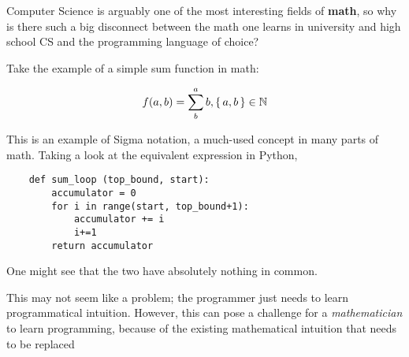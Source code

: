 \documentclass[../main.tex]{subfiles}
\begin{document}
Computer Science is arguably one of the most interesting fields of \textbf{math}, so why is there such a big disconnect between the math one learns in university and high school CS and the programming language of choice?

Take the example of a simple sum function in math:

\[ f(a, b) = \sum^a_{b} b , \set{a,b} \in \mathbb{N}  \]

This is an example of Sigma notation, a much-used concept in many parts of math. Taking a look at the equivalent expression in Python,

\begin{verbatim}
    def sum_loop (top_bound, start):
        accumulator = 0
        for i in range(start, top_bound+1):
            accumulator += i
            i+=1
        return accumulator
\end{verbatim}

One might see that the two have absolutely nothing in common.

This may not seem like a problem; the programmer just needs to learn programmatical intuition. However, this can pose a challenge for a \textit{mathematician} to learn programming, because of the existing mathematical intuition that needs to be replaced
\end{document}
